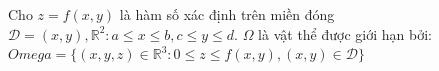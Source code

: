 \documentclass[preview]{standalone}
\begin{document}
\parbox{6cm}{Cho $z = f(x, y)$ là hàm số xác định trên miền đóng $\mathcal{D} = {(x,y), \mathbb{R}^2 : a \leq x \leq b, c \leq y \leq d}$. $\Omega$ là vật thể được giới hạn bởi: $Omega = \{(x,y,z) \in \mathbb{R}^3 : 0 \leq z \leq f(x,y), (x,y) \in \mathcal{D}\}$}
\end{document}

